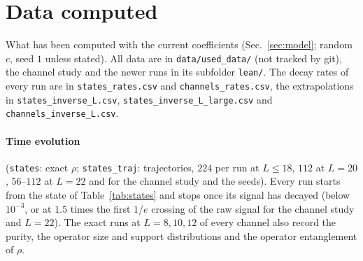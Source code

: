 \section{Data computed}
\label{sec:data}

What has been computed with the current coefficients (Sec.~\ref{sec:model}; random $c$, seed $1$ unless stated). All data are in \texttt{data/used\_data/} (not tracked by git), the channel study and the newer runs in its subfolder \texttt{lean/}. The decay rates of every run are in \texttt{states\_rates.csv} and \texttt{channels\_rates.csv}, the extrapolations in \texttt{states\_\allowbreak inverse\_\allowbreak L.csv}, \texttt{states\_\allowbreak inverse\_\allowbreak L\_\allowbreak large.csv} and \texttt{channels\_\allowbreak inverse\_\allowbreak L.csv}.

\paragraph{Time evolution} (\texttt{states}: exact $\rho$; \texttt{states\_traj}: trajectories, $224$ per run at $L \le 18$, $112$ at $L = 20$, $56$--$112$ at $L = 22$ and for the channel study and the seeds). Every run starts from the state of Table~\ref{tab:states} and stops once its signal has decayed (below $10^{-3}$, or at $1.5$ times the first $1/e$ crossing of the raw signal for the channel study and $L = 22$). The exact runs at $L = 8, 10, 12$ of every channel also record the purity, the operator size and support distributions and the operator entanglement of $\rho$.
